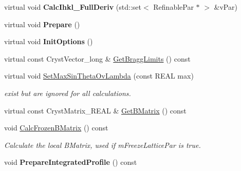 \begin{DoxyCompactItemize}
\item 
\mbox{\label{class_obj_cryst_1_1_powder_pattern_diffraction_abd37063d0c72a76851a9130e238f4ccc}} 
virtual void {\bfseries Calc\+Ihkl\+\_\+\+Full\+Deriv} (std\+::set$<$ Refinable\+Par $\ast$ $>$ \&v\+Par)
\item 
\mbox{\label{class_obj_cryst_1_1_powder_pattern_diffraction_a4d286783fa69fc947b9e84c9281a3600}} 
virtual void {\bfseries Prepare} ()
\item 
\mbox{\label{class_obj_cryst_1_1_powder_pattern_diffraction_ae96dee8cd318b6b02638834f321e339a}} 
virtual void {\bfseries Init\+Options} ()
\item 
virtual const Cryst\+Vector\+\_\+long \& \mbox{\hyperlink{class_obj_cryst_1_1_powder_pattern_diffraction_a9d2ea6f73a2a65a3d5eec0bc892a976f}{Get\+Bragg\+Limits}} () const
\item 
virtual void \mbox{\hyperlink{class_obj_cryst_1_1_powder_pattern_diffraction_a6eabf890d810833b58a903f70dad5885}{Set\+Max\+Sin\+Theta\+Ov\+Lambda}} (const R\+E\+AL max)
\begin{DoxyCompactList}\small\item\em exist but are ignored for all calculations. \end{DoxyCompactList}\item 
virtual const Cryst\+Matrix\+\_\+\+R\+E\+AL \& \mbox{\hyperlink{class_obj_cryst_1_1_powder_pattern_diffraction_ac2079a53e2f3655ea04aa79474dfb970}{Get\+B\+Matrix}} () const
\item 
\mbox{\label{class_obj_cryst_1_1_powder_pattern_diffraction_ac3e6761922510ee327195bc63464469a}} 
void \mbox{\hyperlink{class_obj_cryst_1_1_powder_pattern_diffraction_ac3e6761922510ee327195bc63464469a}{Calc\+Frozen\+B\+Matrix}} () const
\begin{DoxyCompactList}\small\item\em Calculate the local B\+Matrix, used if m\+Freeze\+Lattice\+Par is true. \end{DoxyCompactList}\item 
\mbox{\label{class_obj_cryst_1_1_powder_pattern_diffraction_aa868517cb04ae5a7d26bab4c7ea54e48}} 
void {\bfseries Prepare\+Integrated\+Profile} () const
\end{DoxyCompactItemize}
